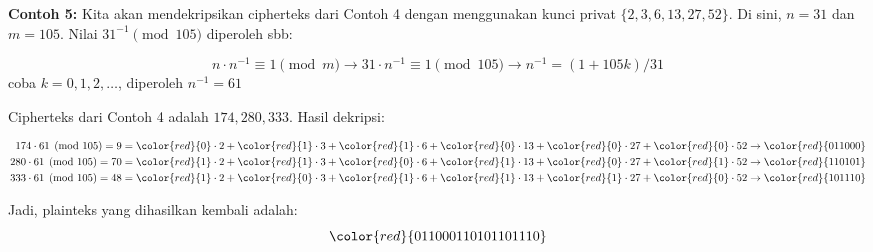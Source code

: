 \documentclass{article}
\begin{document}

\textbf{Contoh 5:} Kita akan mendekripsikan cipherteks dari Contoh 4 dengan menggunakan kunci privat $\{2, 3, 6, 13, 27, 52\}$. Di sini, $n = 31$ dan $m = 105$. Nilai $31^{-1} \pmod{105}$ diperoleh sbb:

\[ n \cdot n^{-1} \equiv 1 \pmod{m} \rightarrow 31 \cdot n^{-1} \equiv 1 \pmod{105} \rightarrow n^{-1} = (1 + 105k)/31 \]
coba $k = 0, 1, 2, \dots$, diperoleh $n^{-1} = 61$

Cipherteks dari Contoh 4 adalah $174, 280, 333$. Hasil dekripsi:

\begin{align*}
174 \cdot 61 \pmod{105} = 9 &= \color{red}{0} \cdot 2 + \color{red}{1} \cdot 3 + \color{red}{1} \cdot 6 + \color{red}{0} \cdot 13 + \color{red}{0} \cdot 27 + \color{red}{0} \cdot 52 \rightarrow \color{red}{011000} \\
280 \cdot 61 \pmod{105} = 70 &= \color{red}{1} \cdot 2 + \color{red}{1} \cdot 3 + \color{red}{0} \cdot 6 + \color{red}{1} \cdot 13 + \color{red}{0} \cdot 27 + \color{red}{1} \cdot 52 \rightarrow \color{red}{110101} \\
333 \cdot 61 \pmod{105} = 48 &= \color{red}{1} \cdot 2 + \color{red}{0} \cdot 3 + \color{red}{1} \cdot 6 + \color{red}{1} \cdot 13 + \color{red}{1} \cdot 27 + \color{red}{0} \cdot 52 \rightarrow \color{red}{101110} 
\end{align*}

Jadi, plainteks yang dihasilkan kembali adalah:
\[ \color{red}{011000110101101110} \]
\end{document}
